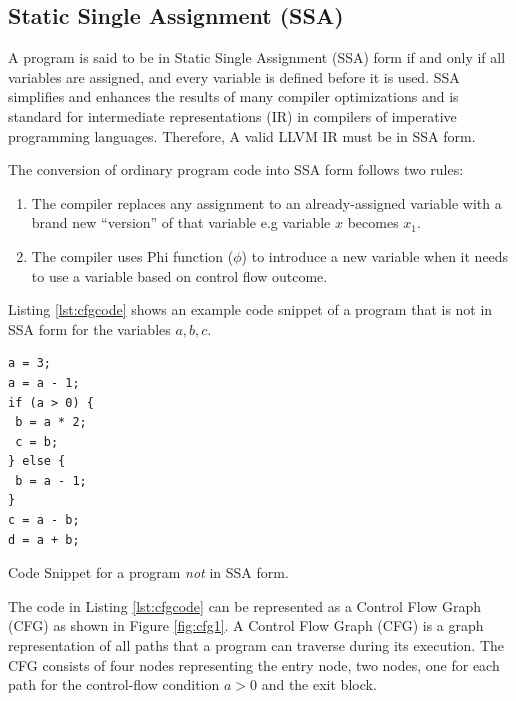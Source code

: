 \subsection{Static Single Assignment (SSA)}
A program is said to be in Static Single Assignment (SSA) \cite{ssa} form if and only if all variables are assigned, and every variable is defined before it is used. SSA simplifies and enhances the results of many compiler optimizations and is standard for intermediate representations (IR) in compilers of imperative programming languages. Therefore, A valid LLVM IR must be in SSA form.

\noindent The conversion of ordinary program code into SSA form follows two rules:
\begin{enumerate}
    \item The compiler replaces any assignment to an already-assigned variable with a brand new “version” of that variable e.g variable \texttt{\textbf{$x$}} becomes \texttt{\textbf{$x_1$}}.
    \item The compiler uses Phi function ($\phi$) to introduce a new variable when it needs to use a variable based on control flow outcome.
\end{enumerate}

Listing \ref{lst:cfgcode} shows an example code snippet of a program that is not in SSA form for the variables $a, b, c$.

\begin{listing}[htbp]
\begin{verbatim}
a = 3;
a = a - 1;
if (a > 0) {
 b = a * 2;
 c = b;
} else {
 b = a - 1;
}
c = a - b;
d = a + b;
\end{verbatim}
\caption{Code Snippet for a program \textit{not} in SSA form.}
\label{lst:cfgcode}
\end{listing}

The code in Listing \ref{lst:cfgcode} can be represented as a Control Flow Graph (CFG) as shown in Figure \ref{fig:cfg1}. A Control Flow Graph (CFG) is a graph representation of all paths that a program can traverse during its execution. The CFG consists of four nodes representing the entry node, two nodes, one for each path for the control-flow condition $a > 0$ and the exit block.


